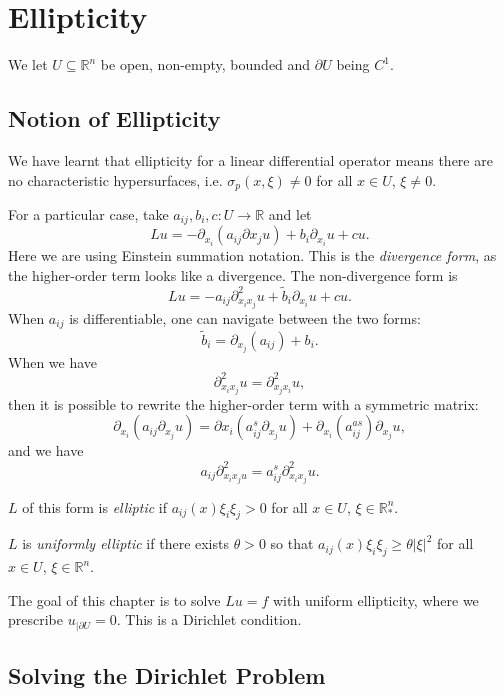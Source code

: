 \documentclass[12pt]{article}
\begin{document}

\newpage

\section{Ellipticity}%
\label{sec:ell}

We let $U \subseteq \mathbb{R}^n$ be open, non-empty, bounded and $\partial U$ being $C^1$.

\subsection{Notion of Ellipticity}%
\label{sub:noe}

We have learnt that ellipticity for a linear differential operator means there are no characteristic hypersurfaces, i.e. $\sigma_p(x, \xi) \neq 0$ for all $x \in U$, $\xi \neq 0$.

For a particular case, take $a_{ij}, b_i , c : U \to \mathbb{R}$ and let
\[
Lu = - \partial_{x_i} (a_{ij} \partial x_j u) + b_i \partial_{x_i} u + cu.
\]
Here we are using Einstein summation notation. This is the \emph{divergence form}, as the higher-order term looks like a divergence. The non-divergence form is
\[
Lu = - a_{ij} \partial^2_{x_i x_j} u + \tilde b_i \partial_{x_i} u + cu.
\]
When $a_{ij}$ is differentiable, one can navigate between the two forms:
\[
\tilde b_i = \partial_{x_j}(a_{ij}) + b_i.
\]
When we have
\[
\partial^2_{x_i x_j} u = \partial^2_{x_j x_i} u,
\]
then it is possible to rewrite the higher-order term with a symmetric matrix:
\[
\partial_{x_i}(a_{ij} \partial_{x_j} u) = \partial x_i (a_{ij}^s \partial_{x_j} u) + \partial_{x_i} (a_{ij}^{as}) \partial_{x_j} u,
\]
and we have
\[
a_{ij} \partial^2_{x_i x_j u} = a_{ij}^s \partial^2_{x_i x_j} u.
\]
\begin{definition}
	$L$ of this form is \emph{elliptic} if $a_{ij}(x) \xi_i \xi_j > 0$ for all $x \in U$, $\xi \in \mathbb{R}^n_{\ast}$.

	$L$ is \emph{uniformly elliptic} if there exists $\theta > 0$ so that $a_{ij}(x) \xi_i \xi_j \geq \theta |\xi|^2$ for all $x \in U$, $\xi \in \mathbb{R}^n$.
\end{definition}

The goal of this chapter is to solve $Lu = f$ with uniform ellipticity, where we prescribe $u_{|\partial U} = 0$. This is a Dirichlet condition.

\subsection{Solving the Dirichlet Problem}%
\label{sub:sdp}
\end{document}
